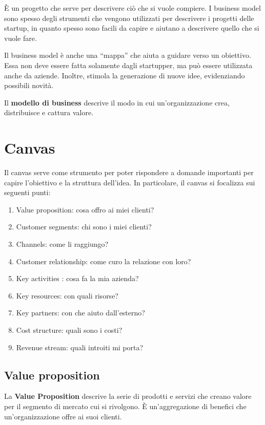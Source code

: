 È un progetto che serve per descrivere ciò che si vuole compiere. I business
model sono spesso degli strumenti che vengono utilizzati per descrivere i
progetti delle startup, in quanto spesso sono facili da capire e aiutano a
descrivere quello che si vuole fare.

Il business model è anche una ``mappa'' che aiuta a guidare verso un obiettivo.
Essa non deve essere fatta solamente dagli startupper, ma può essere utilizzata
anche da aziende. Inoltre, stimola la generazione di nuove idee, evidenziando
possibili novità.

\begin{definition}
Il \textbf{modello di business} descrive il modo in cui un'organizzazione crea,
distribuisce e cattura valore.
\end{definition}

\section{Canvas}

Il canvas serve come strumento per poter rispondere a domande importanti per
capire l'obiettivo e la struttura dell'idea. In particolare, il
canvas si focalizza sui seguenti punti:
\begin{enumerate}
 \item Value proposition: cosa offro ai miei clienti?
 \item Customer segments: chi sono i miei clienti?
 \item Channels: come li raggiungo?
 \item Customer relationship: come curo la relazione con loro?
 \item Key activities : cosa fa la mia azienda?
 \item Key resources: con quali risorse?
 \item Key partners: con che aiuto dall'esterno?
 \item Cost structure: quali sono i costi?
 \item Revenue stream: quali introiti mi porta?
\end{enumerate}

\subsection{Value proposition}

\begin{definition}
La \textbf{Value Proposition} descrive la serie di prodotti e servizi che
creano valore per il segmento di mercato cui si rivolgono. È un'aggregazione di
benefici che un'organizzazione offre ai suoi clienti.
\end{definition}

